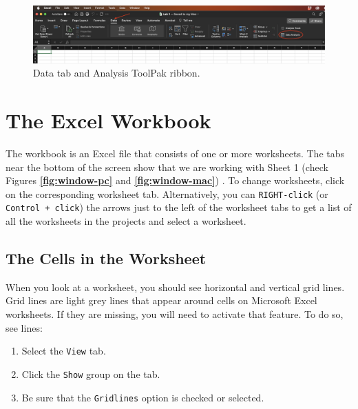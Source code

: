 \documentclass[
]{book}
\providecommand{\tightlist}{%
  \setlength{\itemsep}{0pt}\setlength{\parskip}{0pt}}
\begin{document}
\begin{figure}

{\centering \includegraphics[width=0.9\linewidth]{check_toolpak_mac} 

}

\caption{Data tab and Analysis ToolPak ribbon.}\label{fig:check-toolpak-mac}
\end{figure}

\hypertarget{workbook}{%
\section{The Excel Workbook}\label{workbook}}

The workbook is an Excel file that consists of one or more worksheets. The tabs near the bottom of the screen show that we are working with Sheet 1 (check Figures \textbf{\ref{fig:window-pc}} and \textbf{\ref{fig:window-mac}}) . To change worksheets, click on the corresponding worksheet tab. Alternatively, you can \texttt{RIGHT-click} (or \texttt{Control\ +\ click}) the arrows just to the left of the worksheet tabs to get a list of all the worksheets in the projects and select a worksheet.

\hypertarget{the-cells-in-the-worksheet}{%
\subsection{The Cells in the Worksheet}\label{the-cells-in-the-worksheet}}

When you look at a worksheet, you should see horizontal and vertical grid lines. Grid lines are light grey lines that appear around cells on Microsoft Excel worksheets. If they are missing, you will need to activate that feature. To do so, see lines:

\begin{enumerate}
\def\labelenumi{\arabic{enumi}.}
\tightlist
\item
  Select the \texttt{View} tab.
\item
  Click the \texttt{Show} group on the tab.
\item
  Be sure that the \texttt{Gridlines} option is checked or selected.
\end{enumerate}
\end{document}
